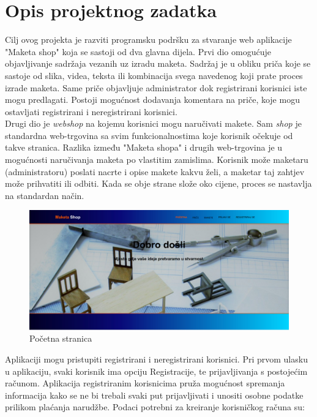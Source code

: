 \chapter{Opis projektnog zadatka}
		
		
		\indent Cilj ovog projekta je razviti programsku podršku za stvaranje web aplikacije "Maketa shop" koja se sastoji od dva glavna dijela. 
		\indent Prvi dio omogućuje objavljivanje sadržaja vezanih uz izradu maketa. Sadržaj je u obliku priča koje se sastoje od slika, videa, teksta ili kombinacija svega navedenog koji prate proces izrade maketa. Same priče objavljuje administrator dok registrirani korisnici iste mogu predlagati. Postoji mogućnost dodavanja komentara na priče, koje mogu ostavljati registrirani i neregistrirani korisnici. \\
		\indent Drugi dio je \textit{webshop} na kojemu korisnici mogu naručivati makete. Sam \textit{shop} je standardna web-trgovina sa svim funkcionalnostima koje korisnik očekuje od takve stranica. Razlika između "Maketa shopa" i drugih web-trgovina je u mogućnosti naručivanja maketa po vlastitim zamislima. Korisnik može maketaru (administratoru) poslati nacrte i opise makete kakvu želi, a maketar taj zahtjev može prihvatiti ili odbiti. Kada se obje strane slože oko cijene, proces se nastavlja na standardan način.
		
		\begin{figure}[H]
			\includegraphics[width=.9\linewidth]{slike/index.jpg}
			\centering
			\caption{Početna stranica}
			\label{fig:opis1}
		\end{figure}
	
		Aplikaciji mogu pristupiti registrirani i neregistrirani korisnici. Pri prvom ulasku u aplikaciju, svaki korisnik ima opciju Registracije, te prijavljivanja s postojećim računom. Aplikacija registriranim korisnicima pruža mogućnost spremanja informacija kako se ne bi trebali svaki put prijavljivati i unositi osobne podatke prilikom plaćanja narudžbe. Podaci potrebni za kreiranje korisničkog računa su:
		
